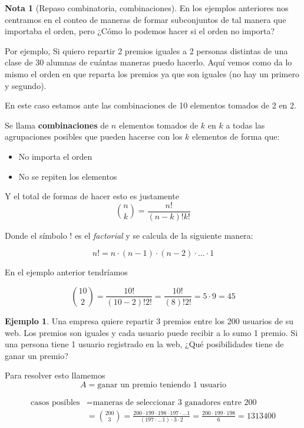 \documentclass[]{book}
\theoremstyle{plain}
\theoremstyle{definition}
\newtheorem{note}[theorem]{Nota}
\newtheorem{example}[theorem]{Ejemplo}
\begin{document}
\begin{note}[Repaso combinatoria, combinaciones]

En los ejemplos anteriores nos centramos en el conteo de maneras de formar subconjuntos de tal manera que importaba el orden, pero ¿Cómo lo podemos hacer si el orden no importa?

Por ejemplo, Si quiero repartir 2 premios iguales a 2 personas distintas de una clase de 30 alumnas de cuántas maneras puedo hacerlo. 
Aquí vemos como  da lo mismo el orden en que reparta los premios ya que son iguales (no hay un primero y segundo).

En este caso estamos ante las combinaciones de 10 elementos tomados de 2 en 2.

Se llama \textbf{combinaciones} de $n$ elementos tomados de  $k$ en $k$
a todas las agrupaciones posibles que pueden hacerse con los 
$k$ elementos de forma que:
\begin{itemize}
  \item No importa el orden
  \item No se repiten los elementos
\end{itemize}

Y el total de formas de hacer esto es justamente
\[{n \choose k} = \frac{n!}{(n-k)! k!}\]

Donde el símbolo $!$ es el \emph{factorial} y se calcula de la siguiente manera:

\[n! = n \cdot (n-1) \cdot (n-2) \cdot \ldots \cdot 1\]

En el ejemplo anterior tendríamos 

\[{10 \choose 2} = \frac{10!}{(10-2)! 2!} = \frac{10!}{(8)! 2!} = 5\cdot 9 = 45\]


\begin{example}
  Una empresa quiere repartir 3 premios entre los 200 usuarios de su web. Los premios son iguales y cada usuario puede recibir a lo sumo 1 premio.
  Si una persona tiene 1 usuario registrado en la web, ¿Qué posibilidades tiene de ganar un premio? 

  Para resolver esto llamemos
  $$A=\text{ganar un premio teniendo 1 usuario}$$

\begin{align*}
  \text{casos posibles}&= \text{maneras de seleccionar 3 ganadores entre 200}\\
  &={200 \choose 3} = \frac{200 \cdot 199 \cdot 198 \cdot 197 \cdot \ldots 1 }{(197 \cdot \ldots 1)\cdot 3\cdot 2} = \frac{200 \cdot 199 \cdot 198}{6} = 1313400
\end{align*}


\end{example}
\end{note}
\end{document}
